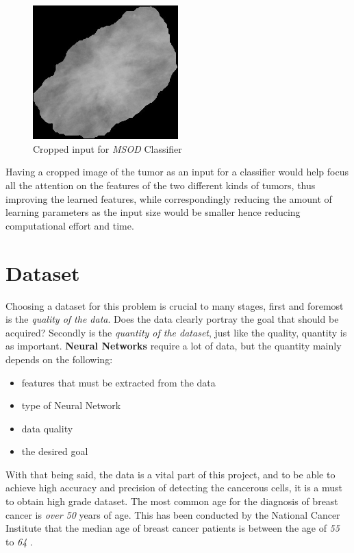 \documentclass[12pt]{extarticle}
\begin{document}
	\begin{figure}[h]
		\centering
		\includegraphics[width=0.5\textwidth]{pics/Figures/cropped.jpg}
		\caption{\small{Cropped input for \emph{MSOD} Classifier}}
		\label{fig:cropped}
	\end{figure}
	Having a cropped image of the tumor as an input for a classifier would help focus all the attention on the features of the two different kinds of tumors, thus improving the learned features, while correspondingly reducing the amount of learning parameters as the input size would be smaller hence reducing computational effort and time.
	\newpage
	\section{Dataset}\label{Data}
	Choosing a dataset for this problem is crucial to many stages, first and foremost is the \emph{quality of the data}. Does the data clearly portray the goal that should be acquired? Secondly is the \emph{quantity of the dataset}, just like the quality, quantity is as important. \textbf{Neural Networks} require a lot of data, but the quantity mainly depends on the following:
	\begin{itemize}
		\item features that must be extracted from the data
		\item type of Neural Network
		\item data quality
		\item the desired goal
	\end{itemize}
	With that being said, the data is a vital part of this project, and to be able to achieve high accuracy and precision of detecting the cancerous cells, it is a must to obtain high grade dataset. 
	The most common age for the diagnosis of breast cancer is \emph{over 50} years of age. This has been conducted by the National Cancer Institute that the median age of breast cancer patients is between the age of \emph{55} to \emph{64} \cite{CDC}. 
	\\[5mm]
\end{document}
